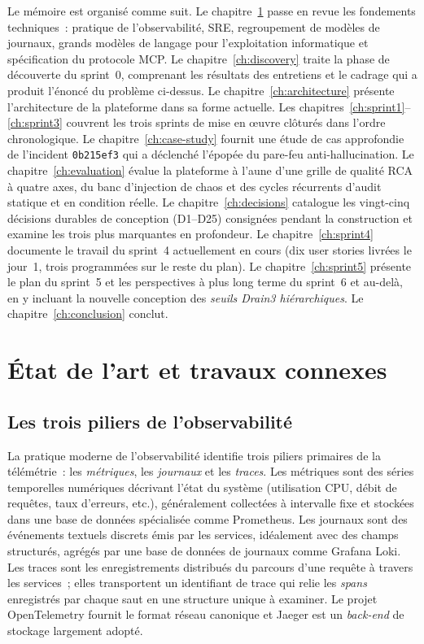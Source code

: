 \documentclass[11pt,a4paper,oneside]{report}
\begin{document}
Le mémoire est organisé comme suit. Le chapitre~\ref{ch:background}
passe en revue les fondements techniques~: pratique de
l'observabilité, SRE, regroupement de modèles de journaux, grands
modèles de langage pour l'exploitation informatique et spécification
du protocole MCP. Le chapitre~\ref{ch:discovery} traite la phase de
découverte du sprint~0, comprenant les résultats des entretiens et
le cadrage qui a produit l'énoncé du problème ci-dessus. Le
chapitre~\ref{ch:architecture} présente l'architecture de la
plateforme dans sa forme actuelle. Les
chapitres~\ref{ch:sprint1}--\ref{ch:sprint3} couvrent les trois
sprints de mise en \oe{}uvre clôturés dans l'ordre chronologique. Le
chapitre~\ref{ch:case-study} fournit une étude de cas approfondie de
l'incident \texttt{0b215ef3} qui a déclenché l'épopée du pare-feu
anti-hallucination. Le chapitre~\ref{ch:evaluation} évalue la
plateforme à l'aune d'une grille de qualité RCA à quatre axes, du
banc d'injection de chaos et des cycles récurrents d'audit statique
et en condition réelle. Le chapitre~\ref{ch:decisions} catalogue les
vingt-cinq décisions durables de conception (D1--D25) consignées
pendant la construction et examine les trois plus marquantes en
profondeur. Le chapitre~\ref{ch:sprint4} documente le travail du
sprint~4 actuellement en cours (dix user stories livrées le
jour~1, trois programmées sur le reste du plan). Le
chapitre~\ref{ch:sprint5} présente le plan du sprint~5 et les
perspectives à plus long terme du sprint~6 et au-delà, en y
incluant la nouvelle conception des \emph{seuils Drain3
hiérarchiques}. Le chapitre~\ref{ch:conclusion} conclut.

\chapter{État de l'art et travaux connexes}
\label{ch:background}

\section{Les trois piliers de l'observabilité}

La pratique moderne de l'observabilité identifie trois piliers
primaires de la télémétrie~: les \emph{métriques}, les \emph{journaux}
et les \emph{traces}. Les métriques sont des séries temporelles
numériques décrivant l'état du système (utilisation CPU, débit de
requêtes, taux d'erreurs, etc.), généralement collectées à intervalle
fixe et stockées dans une base de données spécialisée comme
Prometheus. Les journaux sont des événements textuels discrets émis
par les services, idéalement avec des champs structurés, agrégés par
une base de données de journaux comme Grafana Loki. Les traces sont
les enregistrements distribués du parcours d'une requête à travers
les services~; elles transportent un identifiant de trace qui relie
les \emph{spans} enregistrés par chaque saut en une structure unique
à examiner. Le projet OpenTelemetry fournit le format réseau
canonique et Jaeger est un \emph{back-end} de stockage largement
adopté.
\end{document}
